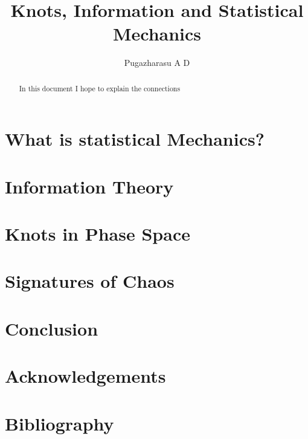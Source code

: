 \documentclass[]{article}
\title{Knots, Information and Statistical Mechanics}
\author{Pugazharasu A D}
\begin{document}
\maketitle

\begin{abstract}
In this document I hope to explain the connections
\end{abstract}

\section{What is statistical Mechanics?}

\section{Information Theory}

\section{Knots in Phase Space}

\section{Signatures of Chaos}

\section{Conclusion}

\section{Acknowledgements}

\section{Bibliography}
\end{document}
